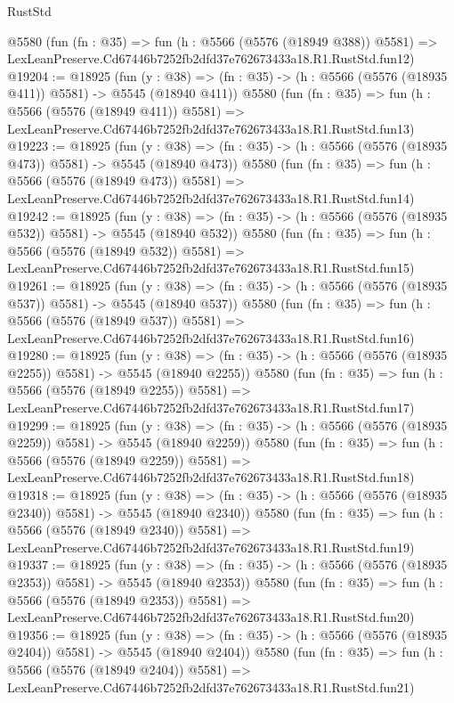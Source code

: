 \begin{lexlean}{RustStd}
\begin{coremodule}
    @5580
    (fun (fn : @35) =>
    fun (h : @5566 (@5576 (@18949 @388)) @5581) =>
    LexLeanPreserve.Cd67446b7252fb2dfd37e762673433a18.R1.RustStd.fun12)
@19204 := @18925
    (fun (y : @38) => (fn : @35) -> (h : @5566 (@5576 (@18935 @411)) @5581) -> @5545 (@18940 @411))
    @5580
    (fun (fn : @35) =>
    fun (h : @5566 (@5576 (@18949 @411)) @5581) =>
    LexLeanPreserve.Cd67446b7252fb2dfd37e762673433a18.R1.RustStd.fun13)
@19223 := @18925
    (fun (y : @38) => (fn : @35) -> (h : @5566 (@5576 (@18935 @473)) @5581) -> @5545 (@18940 @473))
    @5580
    (fun (fn : @35) =>
    fun (h : @5566 (@5576 (@18949 @473)) @5581) =>
    LexLeanPreserve.Cd67446b7252fb2dfd37e762673433a18.R1.RustStd.fun14)
@19242 := @18925
    (fun (y : @38) => (fn : @35) -> (h : @5566 (@5576 (@18935 @532)) @5581) -> @5545 (@18940 @532))
    @5580
    (fun (fn : @35) =>
    fun (h : @5566 (@5576 (@18949 @532)) @5581) =>
    LexLeanPreserve.Cd67446b7252fb2dfd37e762673433a18.R1.RustStd.fun15)
@19261 := @18925
    (fun (y : @38) => (fn : @35) -> (h : @5566 (@5576 (@18935 @537)) @5581) -> @5545 (@18940 @537))
    @5580
    (fun (fn : @35) =>
    fun (h : @5566 (@5576 (@18949 @537)) @5581) =>
    LexLeanPreserve.Cd67446b7252fb2dfd37e762673433a18.R1.RustStd.fun16)
@19280 := @18925
    (fun (y : @38) =>
    (fn : @35) -> (h : @5566 (@5576 (@18935 @2255)) @5581) -> @5545 (@18940 @2255))
    @5580
    (fun (fn : @35) =>
    fun (h : @5566 (@5576 (@18949 @2255)) @5581) =>
    LexLeanPreserve.Cd67446b7252fb2dfd37e762673433a18.R1.RustStd.fun17)
@19299 := @18925
    (fun (y : @38) =>
    (fn : @35) -> (h : @5566 (@5576 (@18935 @2259)) @5581) -> @5545 (@18940 @2259))
    @5580
    (fun (fn : @35) =>
    fun (h : @5566 (@5576 (@18949 @2259)) @5581) =>
    LexLeanPreserve.Cd67446b7252fb2dfd37e762673433a18.R1.RustStd.fun18)
@19318 := @18925
    (fun (y : @38) =>
    (fn : @35) -> (h : @5566 (@5576 (@18935 @2340)) @5581) -> @5545 (@18940 @2340))
    @5580
    (fun (fn : @35) =>
    fun (h : @5566 (@5576 (@18949 @2340)) @5581) =>
    LexLeanPreserve.Cd67446b7252fb2dfd37e762673433a18.R1.RustStd.fun19)
@19337 := @18925
    (fun (y : @38) =>
    (fn : @35) -> (h : @5566 (@5576 (@18935 @2353)) @5581) -> @5545 (@18940 @2353))
    @5580
    (fun (fn : @35) =>
    fun (h : @5566 (@5576 (@18949 @2353)) @5581) =>
    LexLeanPreserve.Cd67446b7252fb2dfd37e762673433a18.R1.RustStd.fun20)
@19356 := @18925
    (fun (y : @38) =>
    (fn : @35) -> (h : @5566 (@5576 (@18935 @2404)) @5581) -> @5545 (@18940 @2404))
    @5580
    (fun (fn : @35) =>
    fun (h : @5566 (@5576 (@18949 @2404)) @5581) =>
    LexLeanPreserve.Cd67446b7252fb2dfd37e762673433a18.R1.RustStd.fun21)

\end{coremodule}
\end{lexlean}
